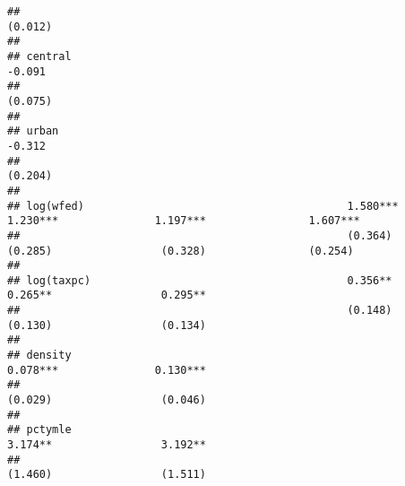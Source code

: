 \documentclass[]{article}
\begin{document}
\begin{verbatim}
##                                                                                                  (0.012)                               
##                                                                                                                                        
## central                                                                                          -0.091                                
##                                                                                                  (0.075)                               
##                                                                                                                                        
## urban                                                                                            -0.312                                
##                                                                                                  (0.204)                               
##                                                                                                                                        
## log(wfed)                                         1.580***               1.230***               1.197***                1.607***       
##                                                   (0.364)                (0.285)                 (0.328)                (0.254)        
##                                                                                                                                        
## log(taxpc)                                        0.356**                0.265**                 0.295**                               
##                                                   (0.148)                (0.130)                 (0.134)                               
##                                                                                                                                        
## density                                                                  0.078***               0.130***                               
##                                                                          (0.029)                 (0.046)                               
##                                                                                                                                        
## pctymle                                                                  3.174**                 3.192**                               
##                                                                          (1.460)                 (1.511)                               

\end{verbatim}
\end{document}
